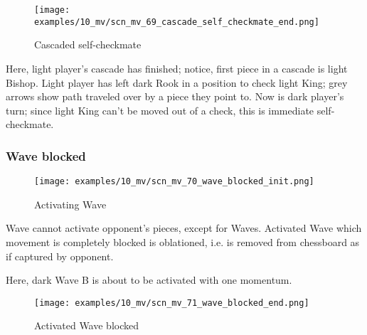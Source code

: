 \vspace*{-2.1\baselineskip}
\noindent
\begin{figure}[h]
\texttt{[image: examples/10\_mv/scn\_mv\_69\_cascade\_self\_checkmate\_end.png]}
\caption{Cascaded self-checkmate}
\label{fig:scn_mv_69_cascade_self_checkmate_end}
\end{figure}

Here, light player's cascade has finished; notice, first piece in a cascade is light
Bishop. Light player has left dark Rook in a position to check light King; grey arrows
show path traveled over by a piece they point to. Now is dark player's turn; since
light King can't be moved out of a check, this is immediate self-checkmate.

\clearpage %

\subsubsection*{Wave blocked}
\label{sec:Miranda's veil/Wave/Cascading opponent/Wave blocked}

\vspace*{-1.4\baselineskip}
\noindent
\begin{figure}[h]
\texttt{[image: examples/10\_mv/scn\_mv\_70\_wave\_blocked\_init.png]}
\caption{Activating Wave}
\label{fig:scn_mv_70_wave_blocked_init}
\end{figure}

Wave cannot activate opponent's pieces, except for Waves. Activated Wave which movement
is completely blocked is oblationed, i.e. is removed from chessboard as if captured by
opponent.

Here, dark Wave B is about to be activated with one momentum.

\clearpage %

\vspace*{-2.1\baselineskip}
\noindent
\begin{figure}[h]
\texttt{[image: examples/10\_mv/scn\_mv\_71\_wave\_blocked\_end.png]}
\caption{Activated Wave blocked}
\label{fig:scn_mv_71_wave_blocked_end}
\end{figure}

